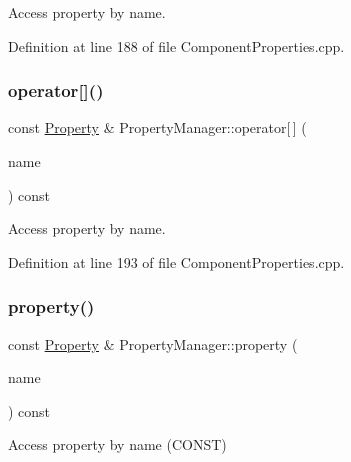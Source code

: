 Access property by name. 



Definition at line 188 of file Component\+Properties.\+cpp.

\hypertarget{class_d_d4hep_1_1_property_manager_a125377ba1788d787d807f102dee9980e}{}\label{class_d_d4hep_1_1_property_manager_a125377ba1788d787d807f102dee9980e} 
\subsubsection{\texorpdfstring{operator[]()}{operator[]()}\hspace{0.1cm}{\footnotesize\ttfamily [2/2]}}
{\footnotesize\ttfamily const \hyperlink{class_d_d4hep_1_1_property}{Property} \& Property\+Manager\+::operator\mbox{[}$\,$\mbox{]} (\begin{DoxyParamCaption}\item[{const std\+::string \&}]{name }\end{DoxyParamCaption}) const}



Access property by name. 



Definition at line 193 of file Component\+Properties.\+cpp.

\hypertarget{class_d_d4hep_1_1_property_manager_af0214bbdd3a5ffb94dcdbc9528295990}{}\label{class_d_d4hep_1_1_property_manager_af0214bbdd3a5ffb94dcdbc9528295990} 
\subsubsection{\texorpdfstring{property()}{property()}\hspace{0.1cm}{\footnotesize\ttfamily [1/2]}}
{\footnotesize\ttfamily const \hyperlink{class_d_d4hep_1_1_property}{Property} \& Property\+Manager\+::property (\begin{DoxyParamCaption}\item[{const std\+::string \&}]{name }\end{DoxyParamCaption}) const}



Access property by name (C\+O\+N\+ST) 


